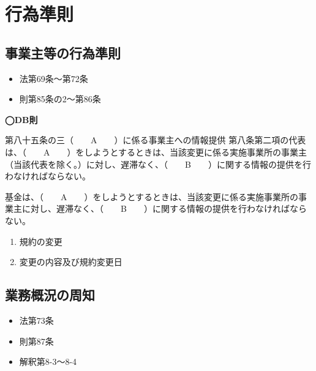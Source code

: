 \section{行為準則}

\subsection{事業主等の行為準則}

\begin{InyouJobunbox}
  \begin{itemize}
    \item 法第69条〜第72条
    \item 則第85条の2〜第86条
  \end{itemize}
\end{InyouJobunbox}

\begin{fillblank}[自作 2026/11/13]
  \noindent \textbf{◯DB則}
  \begin{lawstructure}
    \begin{lawarticle}{第八十五条の三}{（　　A　　）に係る事業主への情報提供}
      第八条第二項の代表は、（　　A　　）をしようとするときは、当該変更に係る実施事業所の事業主（当該代表を除く。）に対し、遅滞なく、（　　B　　）に関する情報の提供を行わなければならない。

      基金は、（　　A　　）をしようとするときは、当該変更に係る実施事業所の事業主に対し、遅滞なく、（　　B　　）に関する情報の提供を行わなければならない。

    \end{lawarticle}
  \end{lawstructure}
\end{fillblank}

\begin{answerbox}
  \begin{enumerate}[A: ]
    \item 規約の変更
    \item 変更の内容及び規約変更日
  \end{enumerate}
\end{answerbox}

\newpage

\subsection{業務概況の周知}

\begin{InyouJobunbox}
  \begin{itemize}
    \item 法第73条
    \item 則第87条
    \item 解釈第8-3〜8-4
  \end{itemize}
\end{InyouJobunbox}

